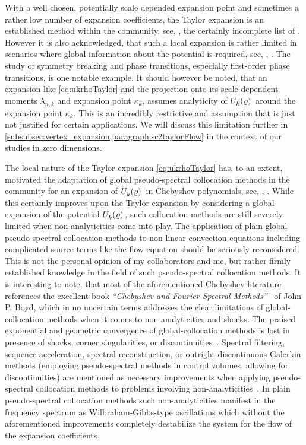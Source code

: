 With a well chosen, potentially scale depended expansion point and sometimes a rather low number of expansion coefficients, the \frg{} Taylor expansion is an established method within the \frg{} community, see, \eg{}, the certainly incomplete list of \ccite{\frgTaylorReferences}.
However it is also acknowledged, that such a local expansion is rather limited in scenarios where global information about the potential is required, see, \eg{}, .
The study of symmetry breaking and phase transitions, especially first-order phase transitions, is one notable example.
It should however be noted, that an expansion like \cref{eq:ukrhoTaylor} and the projection onto its scale-dependent moments $\lambda_{n,k}$ and expansion point $\kappa_k$, \apriori{} assumes analyticity of $\Ukrho{}$ around the expansion point $\kappa_k$.
This is an incredibly restrictive and assumption that is just not justified for certain applications. 
We will discuss this limitation further in \cref{subsubsec:vertex_expansion,paragraph:sc2taylorFlow} in the context of our studies in zero dimensions.\bigskip

The local nature of the \frg{} Taylor expansion \eqref{eq:ukrhoTaylor} has, to an extent, motivated the adaptation of global pseudo-spectral collocation methods in the \frg{} community for an expansion of $\Ukrho{}$ in Chebyshev polynomials, see, \eg{}, \ccite{\frgChebyshevReferences}.
While this certainly improves upon the \frg{} Taylor expansion by considering a global expansion of the potential $\Ukrho{}$, such collocation methods are still severely limited when non-analyticities come into play.
The application of plain global pseudo-spectral collocation methods to non-linear convection equations including complicated source terms \dash{} like the \lpa{} flow equation \dash{} should be seriously reconsidered.
This is not the personal opinion of my collaborators and me, but rather firmly established knowledge in the field of such pseudo-spectral collocation methods.
It is interesting to note, that most of the aforementioned \frg{} Chebyshev literature references the excellent book \textit{``Chebyshev and Fourier Spectral Methods''}~\cite{boyd2001chebyshev} of John P. Boyd, which in no uncertain terms addresses the clear limitations of global-collocation methods when it comes to non-analyticities and shocks.
The praised exponential and geometric convergence of global-collocation methods is lost in presence of shocks, corner singularities, or discontinuities~\cite{boyd2001chebyshev}.
Spectral filtering, sequence acceleration, spectral reconstruction, or outright discontinuous Galerkin methods (employing pseudo-spectral methods in control volumes, allowing for discontinuities) are mentioned as necessary improvements when applying pseudo-spectral collocation methods to problems involving non-analyticities~\cite{boyd2001chebyshev}.
In plain pseudo-spectral collocation methods such non-analyticities manifest in the frequency spectrum as Wilbraham-Gibbs-type oscillations \nolinebreak[3]\cite{Wilbraham:1848,Gibbs:1898,Gibbs:1899} which without the aforementioned improvements completely destabilize the \ode{} system for the flow of the expansion coefficients.

